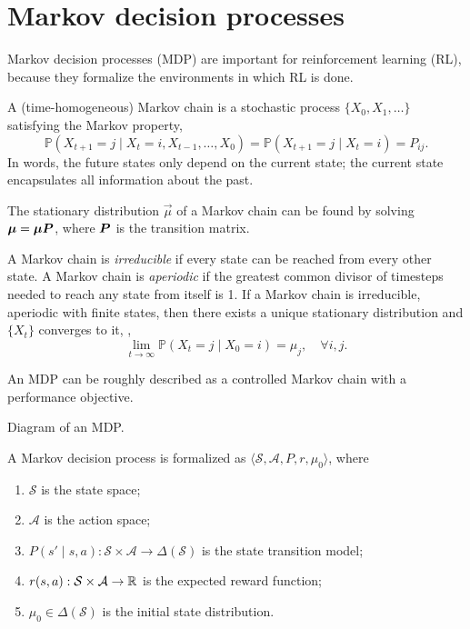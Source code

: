 \section{Markov decision processes}

Markov decision processes (MDP) are important for reinforcement learning (RL), because they
formalize the environments in which RL is done.

\begin{definition}
    A (time-homogeneous) Markov chain is a stochastic process $\{ X_0, X_1, \ldots \}$ satisfying the Markov property, \[
        \mathbb{P}(X_{t+1} = j \mid X_t = i, X_{t-1}, \ldots, X_0) = \mathbb{P}(X_{t+1} = j \mid X_t = i) = P_{ij}.
    \]
    In words, the future states only depend on the current state; the current state encapsulates all
    information about the past.
\end{definition}

The stationary distribution $\vec{\mu}$ of a Markov chain can be found by solving $\bm{\mu} =
    \bm{\mu} \bm{P}$, where $\bm{P}$ is the transition matrix.

A Markov chain is \textit{irreducible} if every state can be reached from every other state. A
Markov chain is \textit{aperiodic} if the greatest common divisor of timesteps needed to reach any
state from itself is 1. If a Markov chain is irreducible, aperiodic with finite states, then there
exists a unique stationary distribution and $\{ X_t \}$ converges to it, \ie, \[
    \lim_{t \to \infty} \mathbb{P}(X_t = j \mid X_0 = i) = \mu_j, \quad \forall i,j.
\]

An MDP can be roughly described as a controlled Markov chain with a performance objective.

\begin{marginfigure}
    \centering
    \caption{Diagram of an MDP.}
    \label{fig:mdp-diagram}
\end{marginfigure}

\begin{definition}
    A Markov decision process is formalized as $\langle \mathcal{S},\mathcal{A},P,r,\mu_0 \rangle$, where
    \begin{enumerate}
        \item $\mathcal{S}$ is the state space;
        \item $\mathcal{A}$ is the action space;
        \item $P(s' \mid s, a): \mathcal{S} \times \mathcal{A} \to \Delta(\mathcal{S})$ is the state transition model;
        \item $r(s, a): \mathcal{S} \times \mathcal{A} \to \mathbb{R}$ is the expected reward function;
        \item $\mu_0 \in \Delta(\mathcal{S})$ is the initial state distribution.
    \end{enumerate}
\end{definition}

